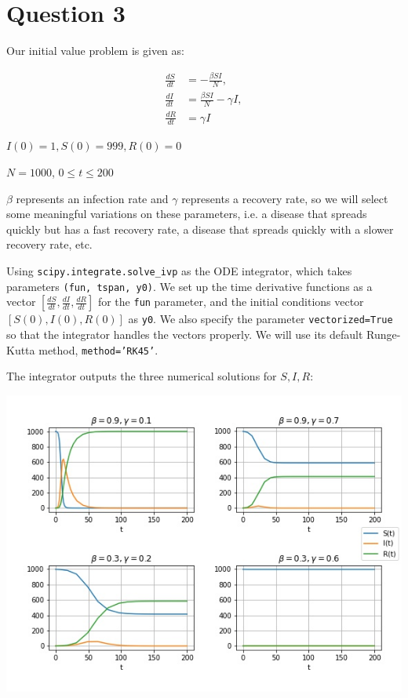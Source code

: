 \documentclass{article}
\begin{document}
\section*{Question 3}

Our initial value problem is given as:

\begin{align}
    \frac{dS}{dt} &= -\frac{\beta S I}{N},\\
    \frac{dI}{dt} &= \frac{\beta S I}{N} - \gamma I,\\
    \frac{dR}{dt} &= \gamma I
\end{align}

$I(0) = 1, S(0)=999, R(0) = 0$

$N=1000$, $0\leq t \leq 200$

$\beta$ represents an infection rate and $\gamma$ represents a recovery rate, so we will select some meaningful variations on these parameters, i.e. a disease that spreads quickly but has a fast recovery rate, a disease that spreads quickly with a slower recovery rate, etc.

Using \texttt{scipy.integrate.solve\_ivp} as the ODE integrator, which takes parameters \texttt{(fun, tspan, y0)}. We set up the time derivative functions as a vector $[\frac{dS}{dt},\frac{dI}{dt},\frac{dR}{dt}]$ for the \texttt{fun} parameter, and the initial conditions vector $[S(0), I(0), R(0)]$ as \texttt{y0}. We also specify the parameter \texttt{vectorized=True} so that the integrator handles the vectors properly. We will use its default Runge-Kutta method, \texttt{method='RK45'}.
	
The integrator outputs the three numerical solutions for $S, I, R$:

\includegraphics[scale=0.75]{plot3}
\end{document}
